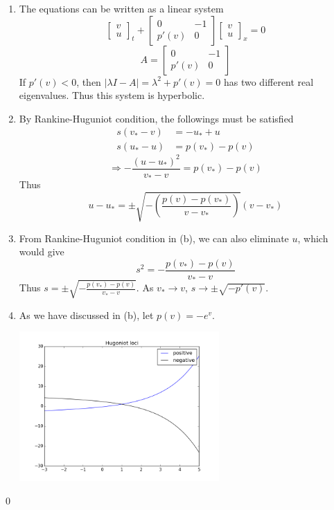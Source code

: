 \documentclass[11pt]{article}
\begin{document}
\begin{enumerate}
        	\begin{enumerate}
        		\item
        			The equations can be written as a linear system
        			\[
        			\begin{bmatrix}v\\u\end{bmatrix}_t+
        			\begin{bmatrix}0&-1\\p'(v)&0\end{bmatrix}
        			\begin{bmatrix}v\\u\end{bmatrix}_x=0
        			\]
        			\[
        			A=\begin{bmatrix}0&-1\\p'(v)&0\end{bmatrix}
        			\]
        			If $p'(v)<0$, then $|\lambda I-A|=\lambda^2+p'(v)=0$ has two different real eigenvalues. Thus this system is hyperbolic.
        		\item
        			By Rankine-Huguniot condition, the followings must be satisfied 
        			\begin{align*}
        			s(v_*-v)&=-u_*+u\\
        			s(u_*-u)&=p(v_*)-p(v)
        			\end{align*}  
        			\[
        			\Rightarrow -\frac{(u-u_*)^2}{v_*-v}=p(v_*)-p(v)
        			\]
        			Thus
        			\[
        			u-u_*=\pm\sqrt{-(\frac{p(v)-p(v_*)}{v-v_*})}(v-v_*)
        			\]
        		\item
        			From Rankine-Huguniot condition in (b), we can also eliminate $u$, which would give
        			\[
        			s^2=-\frac{p(v_*)-p(v)}{v_*-v}
        			\]
        			Thus $s=\pm\sqrt{-\frac{p(v_*)-p(v)}{v_*-v}}$. As $v_*\rightarrow v$, $s\rightarrow \pm\sqrt{-p'(v)}$.
        		\item
        			As we have discussed in (b), let $p(v)=-e^v$.
        			
        			\hfil\includegraphics[width=3.0in]{problem_13_7.png}\hfil

        	\end{enumerate}
\qed

\end{enumerate}
\end{document}

